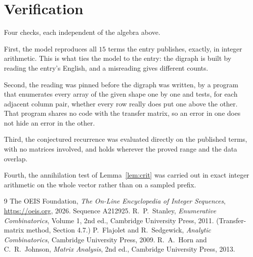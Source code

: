 \documentclass[11pt,a4paper]{article}
\theoremstyle{plain}
\theoremstyle{definition}
\begin{document}
\section{Verification}

Four checks, each independent of the algebra above.

First, the model reproduces all $15$ terms the entry publishes, exactly, in integer
arithmetic. This is what ties the model to the entry: the digraph is built by reading the
entry's English, and a misreading gives different counts.

Second, the reading was pinned before the digraph was written, by a program that enumerates
every array of the given shape one by one and tests, for each adjacent column pair,
whether every row really does put one above the other. That program shares no code with the transfer matrix, so an error in one does not
hide an error in the other.

Third, the conjectured recurrence was evaluated directly on the published terms, with no
matrices involved, and holds wherever the proved range and the data overlap.

Fourth, the annihilation test of Lemma~\ref{lem:crit} was carried out in exact integer
arithmetic on the whole vector rather than on a sampled prefix.

\begin{thebibliography}{9}
 The OEIS Foundation, \emph{The On-Line Encyclopedia of Integer
Sequences}, \url{https://oeis.org}, 2026. Sequence A212925.
 R.~P.~Stanley, \emph{Enumerative Combinatorics}, Volume 1, 2nd ed.,
Cambridge University Press, 2011. (Transfer-matrix method, Section 4.7.)
 P.~Flajolet and R.~Sedgewick, \emph{Analytic Combinatorics}, Cambridge
University Press, 2009.
 R.~A.~Horn and C.~R.~Johnson, \emph{Matrix Analysis}, 2nd ed., Cambridge
University Press, 2013.
\end{thebibliography}
\end{document}
